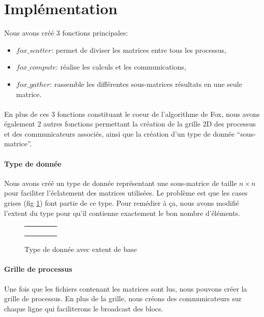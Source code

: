 \documentclass[12pt]{article}
\begin{document}
\section{Implémentation} \label{s:impl}
Nous avons créé 3 fonctions principales:
\begin{itemize}
\item $fox\_scatter$: permet de diviser les matrices entre tous les processus,
\item $fox\_compute$: réalise les calculs et les communications,
\item $fox\_gather$: rassemble les différentes sous-matrices résultats en une seule matrice.
\end{itemize}

\paragraph{}
En plus de ces 3 fonctions constituant le coeur de l'algorithme de Fox, nous avons également 2 autres fonctions permettant la création de la grille 2D des processus et des communicateurs associés, ainsi que la création d'un type de donnée ``sous-matrice''.

\paragraph{Type de donnée}
Nous avons créé un type de donnée représentant une sous-matrice de taille $n\times n$ pour faciliter l'éclatement des matrices utilisées. Le problème est que les cases grises (fig \ref{fig:datatype}) font partie de ce type. Pour remédier à ça, nous avons modifié l'extent du type pour qu'il contienne exactement le bon nombre d'éléments. 


\begin{figure}[ht]
  \centering
  \begin{tabular}{|c|c||c|c|}
    \hline
    \cellcolor{green}& \cellcolor{green} & & \\ 
    \hline
    \cellcolor{green}& \cellcolor{green}& & \\ 
    \hline
    \hline
    \cellcolor{gray}& & & \\ 
    \hline
    \cellcolor{gray}& & & \\ 
    \hline
  \end{tabular}
  \caption{\label{fig:datatype} Type de donnée avec extent de base}
\end{figure}


\paragraph{Grille de processus}
Une fois que les fichiers contenant les matrices sont lus, nous pouvons créer la grille de processus. En plus de la grille, nous créons des communicateurs sur chaque ligne qui faciliterons le broadcast des blocs.
\end{document}
